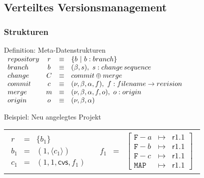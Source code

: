 \documentclass[german]{beamer}
\begin{document}
\subsection{Verteiltes Versionsmanagement}
\newcommand{\STRUCT}[1]{\ensuremath{\mathnormal{#1}}}
\begin{frame}
  \frametitle{Strukturen}

  \begin{block}{Definition: Meta-Datenstrukturen}
    \medskip
    $\begin{array}{lccl}
      \STRUCT{repository} & r & \equiv & \{b\ |\ b : \STRUCT{branch}\} \\
      \STRUCT{branch}     & b & \equiv &
      (\beta, s),\ s : \STRUCT{change\,sequence} \\
      \STRUCT{change}     & C & \equiv &
      \STRUCT{commit}\oplus\STRUCT{merge} \\
      \STRUCT{commit}     & c & \equiv &
      (\nu, \beta, \alpha, f),\ f : \STRUCT{filename}\rightarrow
      \STRUCT{revision} \\
      \STRUCT{merge}      & m & \equiv &
      (\nu, \beta, \alpha, f, o),\ o : \STRUCT{origin} \\
      \STRUCT{origin}     & o & \equiv &
      (\nu, \beta, \alpha)      \end{array}$
  \end{block}

  \begin{block}{Beispiel: Neu angelegtes Projekt}
    \medskip
    \begin{tabular}{ll}
      $\begin{array}{lcl}
        r   &=& \{b_1\} \\
        b_1 &=& (1, \langle c_1 \rangle) \\
        c_1 &=& (1, 1, \mathsf{cvs}, f_1)
      \end{array}$ &
      $\begin{array}{lcl}
        f_1 &=& \left[
          \begin{array}{lcl}
            \mathtt{F-}a & \mapsto & \mathsf{r1.1} \\
            \mathtt{F-}b & \mapsto & \mathsf{r1.1} \\
            \mathtt{F-}c & \mapsto & \mathsf{r1.1} \\
            \mathtt{MAP} & \mapsto & \mathsf{r1.1}
          \end{array}
        \right]
      \end{array}$
    \end{tabular}
  \end{block}
\end{frame}
\end{document}
